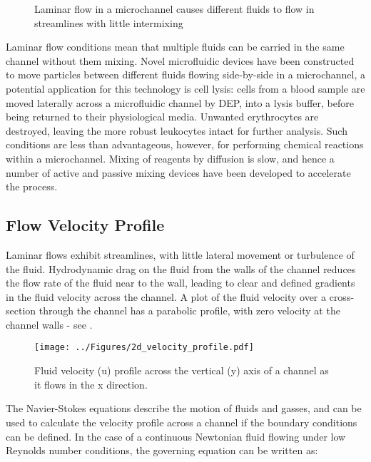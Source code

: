 \begin{figure}
 \centering
 \caption{Laminar flow in a microchannel causes different fluids to flow in streamlines with
little intermixing}
 \label{fig:laminar_flow_sidebyside_fluids}
\end{figure}

Laminar flow conditions mean that multiple fluids can be carried in the same channel without them mixing. Novel microfluidic devices have been constructed to move particles between different fluids flowing side-by-side in a microchannel, a potential application for this technology is cell lysis: cells from a blood sample are moved laterally across a microfluidic channel by DEP, into a lysis buffer, before being returned to their physiological media. Unwanted erythrocytes are destroyed, leaving the more robust leukocytes intact for further analysis. Such conditions are less than advantageous, however, for performing chemical reactions within a microchannel. Mixing of reagents by diffusion is slow, and hence a number of active and passive mixing devices have been developed to accelerate the process.

\subsection{Flow Velocity Profile}
Laminar flows exhibit streamlines, with little lateral movement or turbulence of the fluid. Hydrodynamic drag on the fluid from the walls of the channel reduces the flow rate of the fluid near to the wall, leading to clear and defined gradients in the fluid velocity across the channel. A plot of the fluid velocity over a cross-section through the channel has a parabolic profile, with zero velocity at the channel walls - see .

\begin{figure}
	\centering
	\texttt{[image: ../Figures/2d\_velocity\_profile.pdf]}
	\caption{Fluid velocity (u) profile across the vertical (y) axis of a channel as it flows in the x direction.}
	\label{fig:2d_velocity_profile}
\end{figure}

The Navier-Stokes equations describe the motion of fluids and gasses, and can be used to calculate the velocity profile across a channel if the boundary conditions can be defined. In the case of a continuous Newtonian fluid flowing under low Reynolds number conditions, the governing equation can be written as:

